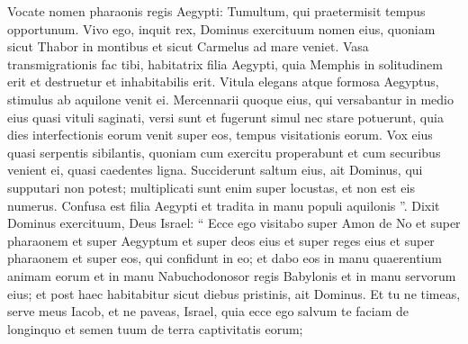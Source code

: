 \begin{biblechapter}
\begin{biblechapter}
\begin{biblechapter}
\begin{biblechapter}
\begin{biblechapter}
\begin{biblechapter}
\begin{biblechapter}
\begin{biblechapter}
\begin{biblechapter}
\begin{biblechapter}
\begin{biblechapter}
\begin{biblechapter}
\begin{biblechapter}
\begin{biblechapter}
\begin{biblechapter}
\begin{biblechapter}
\begin{biblechapter}
\begin{biblechapter}
\begin{biblechapter}
\begin{biblechapter}
\begin{biblechapter}
\begin{biblechapter}
\begin{biblechapter}
\begin{biblechapter}
\begin{biblechapter}
\begin{biblechapter}
\begin{biblechapter}
\begin{biblechapter}
\begin{biblechapter}
\begin{biblechapter}
\begin{biblechapter}
\begin{biblechapter}
\begin{biblechapter}
\begin{biblechapter}
\begin{biblechapter}
\begin{biblechapter}
\begin{biblechapter}
\begin{biblechapter}
\begin{biblechapter}
\begin{biblechapter}
\begin{biblechapter}
\begin{biblechapter}
\begin{biblechapter}
\begin{biblechapter}
\begin{biblechapter}
\begin{biblechapter}
 \verse Vocate nomen pharaonis regis Aegypti:
 Tumultum, qui praetermisit tempus opportunum.
 \verse Vivo ego, inquit rex,
 Dominus exercituum nomen eius,
 quoniam sicut Thabor in montibus
 et sicut Carmelus ad mare veniet.
 \verse Vasa transmigrationis fac tibi,
 habitatrix filia Aegypti,
 quia Memphis in solitudinem erit
 et destruetur et inhabitabilis erit.
 \verse Vitula elegans atque formosa Aegyptus,
 stimulus ab aquilone venit ei.
 \verse Mercennarii quoque eius,
 qui versabantur in medio eius quasi vituli saginati,
 versi sunt et fugerunt simul
 nec stare potuerunt,
 quia dies interfectionis eorum venit super eos,
 tempus visitationis eorum.
 \verse Vox eius quasi serpentis sibilantis,
 quoniam cum exercitu properabunt et cum securibus venient ei,
 quasi caedentes ligna.
 \verse Succiderunt saltum eius,
 ait Dominus,
 qui supputari non potest;
 multiplicati sunt enim super locustas,
 et non est eis numerus.
 \verse Confusa est filia Aegypti
 et tradita in manu populi aquilonis ”.
 \verse Dixit Dominus exercituum, Deus Israel: “ Ecce ego visitabo super Amon de No et super pharaonem et super Aegyptum et super deos eius et super reges eius et super pharaonem et super eos, qui confidunt in eo; 
\verse et dabo eos in manu quaerentium animam eorum et in manu Nabuchodonosor regis Babylonis et in manu servorum eius; et post haec habitabitur sicut diebus pristinis, ait Dominus.
 \verse Et tu ne timeas, serve meus Iacob,
 et ne paveas, Israel,
 quia ecce ego salvum te faciam de longinquo
 et semen tuum de terra captivitatis eorum;

\end{biblechapter}
\end{biblechapter}
\end{biblechapter}
\end{biblechapter}
\end{biblechapter}
\end{biblechapter}
\end{biblechapter}
\end{biblechapter}
\end{biblechapter}
\end{biblechapter}
\end{biblechapter}
\end{biblechapter}
\end{biblechapter}
\end{biblechapter}
\end{biblechapter}
\end{biblechapter}
\end{biblechapter}
\end{biblechapter}
\end{biblechapter}
\end{biblechapter}
\end{biblechapter}
\end{biblechapter}
\end{biblechapter}
\end{biblechapter}
\end{biblechapter}
\end{biblechapter}
\end{biblechapter}
\end{biblechapter}
\end{biblechapter}
\end{biblechapter}
\end{biblechapter}
\end{biblechapter}
\end{biblechapter}
\end{biblechapter}
\end{biblechapter}
\end{biblechapter}
\end{biblechapter}
\end{biblechapter}
\end{biblechapter}
\end{biblechapter}
\end{biblechapter}
\end{biblechapter}
\end{biblechapter}
\end{biblechapter}
\end{biblechapter}
\end{biblechapter}
